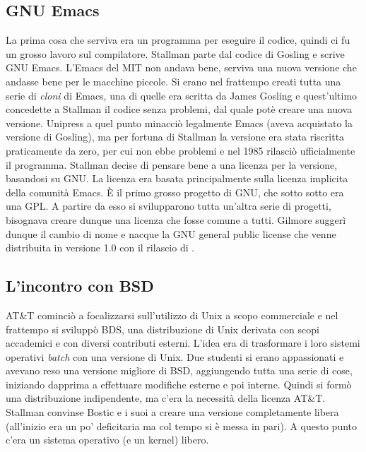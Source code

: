 \subsection{GNU Emacs}

La prima cosa che serviva era un programma per eseguire il codice, quindi ci fu un grosso lavoro sul compilatore. Stallman parte dal codice di Gosling e scrive GNU Emacs. L'Emacs del MIT non andava bene, serviva una nuova versione che andasse bene per le macchine piccole. Si erano nel frattempo creati tutta una serie di \textit{cloni} di Emacs, una di quelle era scritta da James Gosling e quest'ultimo concedette a Stallman il codice senza problemi, dal quale potè creare una nuova versione.
Unipress a quel punto minacciò legalmente Emacs (aveva acquistato la versione di Gosling), ma per fortuna di Stallman la versione era stata riscritta praticamente da zero, per cui non ebbe problemi e nel 1985 rilasciò ufficialmente il programma. 
\linebreak
\linebreak
Stallman decise di pensare bene a una licenza per la versione, basandosi su GNU. La licenza era basata principalmente sulla licenza implicita della comunità Emacs. È il primo grosso progetto di GNU, che sotto sotto era una GPL. A partire da esso si svilupparono tutta un'altra serie di progetti, bisognava creare dunque una licenza che fosse comune a tutti. Gilmore suggerì dunque il cambio di nome e nacque la GNU general public license che venne distribuita in versione 1.0 con il rilascio di .

\subsection{L'incontro con BSD}

AT\&T cominciò a focalizzarsi sull'utilizzo di Unix a scopo commerciale e nel frattempo si sviluppò BDS, una distribuzione di Unix derivata con scopi accademici e con diversi contributi esterni. L'idea era di trasformare i loro sistemi operativi \textit{batch} con una versione di Unix.
Due studenti si erano appassionati e avevano reso una versione migliore di BSD, aggiungendo tutta una serie di cose, iniziando dapprima a effettuare modifiche esterne e poi interne. Quindi si formò una distribuzione indipendente, ma c'era la necessità della licenza AT\&T. Stallman convinse Bostic e i suoi a creare una versione completamente libera (all'inizio era un po' deficitaria ma col tempo si è messa in pari). A questo punto c'era un sistema operativo (e un kernel) libero.

